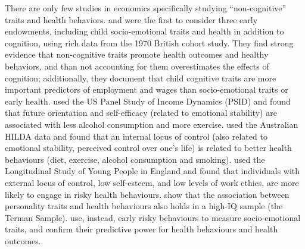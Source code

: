 There are only few studies in economics specifically studying ``non-cognitive'' traits and health behaviors. \citet{conti2010education} and \citet{conti2011early} were the first to consider three early endowments, including child socio-emotional traits and health in addition to cognition, using rich data from the 1970 British cohort study. They find strong evidence that non-cognitive traits promote health outcomes and healthy behaviors, and than not accounting for them overestimates the effects of cognition; additionally, they document that child cognitive traits are more important predictors of employment and wages than socio-emotional traits or early health. \citet{chiteji2010time} used the US Panel Study of Income Dynamics (PSID) and found that future orientation and self-efficacy (related to emotional stability) are associated with less alcohol consumption and more exercise. \citet{cobb2014healthy} used the Australian HILDA data and found that an internal locus of control (also related to emotional stability, perceived control over one's life) is related to better health behaviours (diet, exercise, alcohol consumption and smoking). \citet{mendolia2014effect} used the Longitudinal Study of Young People in England and found that individuals with external locus of control, low self-esteem, and low levels of work ethics, are more likely to engage in risky health behaviours. \citet{savelyev2017socioemotional} show that the association between personality traits and health behaviours also holds in a high-IQ sample (the Terman Sample). \citet{heckmanJPE2018} use, instead, early risky behaviours to measure socio-emotional traits, and confirm their predictive power for health behaviours and health outcomes.

